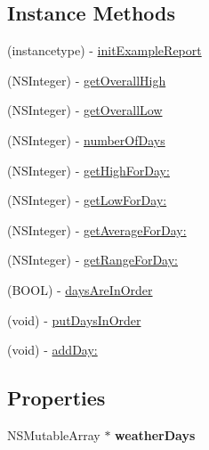 \subsection*{Instance Methods}
\begin{DoxyCompactItemize}
\item 
(instancetype) -\/ \hyperlink{interface_weather_report_ab5d414a63da7d989ad099d5bf79be834}{init\-Example\-Report}
\item 
(N\-S\-Integer) -\/ \hyperlink{interface_weather_report_aa6bbf5b779e0c4598e198adfeef73caa}{get\-Overall\-High}
\item 
(N\-S\-Integer) -\/ \hyperlink{interface_weather_report_a8044a91695febcfbd290533f0a2d7014}{get\-Overall\-Low}
\item 
(N\-S\-Integer) -\/ \hyperlink{interface_weather_report_a43c87e18a2a90ba36e4426e066ec1bc0}{number\-Of\-Days}
\item 
(N\-S\-Integer) -\/ \hyperlink{interface_weather_report_a2f163b73346d557e8e69f1ba4658fd6a}{get\-High\-For\-Day\-:}
\item 
(N\-S\-Integer) -\/ \hyperlink{interface_weather_report_a69f1a204d1941aeab765e2ca4bfd989c}{get\-Low\-For\-Day\-:}
\item 
(N\-S\-Integer) -\/ \hyperlink{interface_weather_report_a486bd3a6c0a1fe14245772adf722f782}{get\-Average\-For\-Day\-:}
\item 
(N\-S\-Integer) -\/ \hyperlink{interface_weather_report_a0d47f6e58cf6ce3c488464935ab82ad4}{get\-Range\-For\-Day\-:}
\item 
(B\-O\-O\-L) -\/ \hyperlink{interface_weather_report_a40763395e5e7eb7dc1b5c42e6f23c83a}{days\-Are\-In\-Order}
\item 
(void) -\/ \hyperlink{interface_weather_report_a2ec4041c4bb88fe1c08f3c017b7e1465}{put\-Days\-In\-Order}
\item 
(void) -\/ \hyperlink{interface_weather_report_a7d7f448785554e24c855e207286a4ac1}{add\-Day\-:}
\end{DoxyCompactItemize}
\subsection*{Properties}
\begin{DoxyCompactItemize}
\item 
\hypertarget{interface_weather_report_a55a1d3dd268bda012d9a097a75497d84}{N\-S\-Mutable\-Array $\ast$ {\bfseries weather\-Days}}\label{interface_weather_report_a55a1d3dd268bda012d9a097a75497d84}

\end{DoxyCompactItemize}


